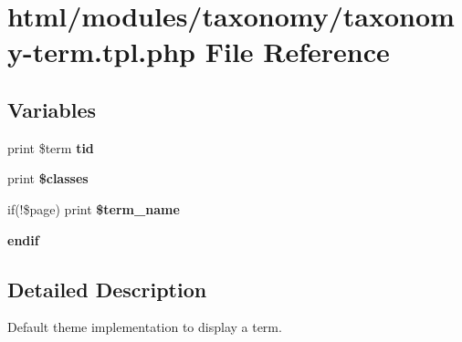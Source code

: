 \hypertarget{taxonomy-term_8tpl_8php}{
\section{html/modules/taxonomy/taxonomy-\/term.tpl.php File Reference}
\label{taxonomy-term_8tpl_8php}
}
\subsection*{Variables}
\begin{DoxyCompactItemize}
\item 
\hypertarget{taxonomy-term_8tpl_8php_aae745342f7451b070ccf6db8f6e7c08f}{
print \$term {\bfseries tid}}
\label{taxonomy-term_8tpl_8php_aae745342f7451b070ccf6db8f6e7c08f}

\item 
\hypertarget{taxonomy-term_8tpl_8php_a6d48ecbdbc70ca1812e665169b5fa1e2}{
print {\bfseries \$classes}}
\label{taxonomy-term_8tpl_8php_a6d48ecbdbc70ca1812e665169b5fa1e2}

\item 
\hypertarget{taxonomy-term_8tpl_8php_ad960fd839235e91c82392f2d78b9ef37}{
if(!\$page) print {\bfseries \$term\_\-name}}
\label{taxonomy-term_8tpl_8php_ad960fd839235e91c82392f2d78b9ef37}

\item 
\hypertarget{taxonomy-term_8tpl_8php_a82cd33ca97ff99f2fcc5e9c81d65251b}{
{\bfseries endif}}
\label{taxonomy-term_8tpl_8php_a82cd33ca97ff99f2fcc5e9c81d65251b}

\end{DoxyCompactItemize}


\subsection{Detailed Description}
Default theme implementation to display a term.

